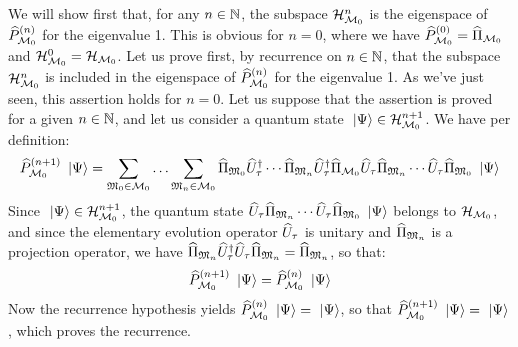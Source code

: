  We will show first that, for any $n \in \mathbb{N}$, the subspace $\mathcal H_{\mathcal M_0}^n$ is the eigenspace of $\widehat{P}_{\mathcal M_0}^{(n)}$ for the eigenvalue 1. This is obvious for $n = 0$, where we have $\widehat{P}_{\mathcal M_0}^{(0)} = \widehat{\Pi}_{\mathcal M_0}$ and $\mathcal H_{\mathcal M_0}^0 = \mathcal H_{\mathcal M_0}$. Let us prove first, by recurrence on $n \in \mathbb{N}$, that the subspace $\mathcal H_{\mathcal M_0}^n$ is included in the eigenspace of $\widehat{P}_{\mathcal M_0}^{(n)}$ for the eigenvalue 1. As we've just seen, this assertion holds for $n = 0$. Let us suppose that the assertion is proved for a given $n \in \mathbb{N}$, and let us consider a quantum state $\ \left|{\Psi}\right\rangle \in \mathcal H_{\mathcal M_0}^{n+1}$. We have per definition:
\begin{equation*}
\widehat{P}_{\mathcal M_0}^{(n+1)} \ \left|{\Psi}\right\rangle = \sum_{\mathfrak{M}_0 \in \mathcal M_0} \dotsc \sum_{\mathfrak{M}_n \in \mathcal M_0} \widehat{\Pi}_{\mathfrak{M}_0} \widehat{U}^{\dagger}_\tau \dotsm \widehat{\Pi}_{\mathfrak{M}_n} \widehat{U}^{\dagger}_\tau \widehat{\Pi}_{\mathcal M_0} \widehat{U}_\tau \widehat{\Pi}_{\mathfrak{M}_n} \dotsm \widehat{U}_\tau \widehat{\Pi}_{\mathfrak{M}_0} \ \left|{\Psi}\right\rangle
\end{equation*}
Since $\ \left|{\Psi}\right\rangle \in \mathcal H_{\mathcal M_0}^{n+1}$, the quantum state $\widehat{U}_\tau \widehat{\Pi}_{\mathfrak{M}_n} \dotsm \widehat{U}_\tau \widehat{\Pi}_{\mathfrak{M}_0} \ \left|{\Psi}\right\rangle$ belongs to $\mathcal H_{\mathcal M_0}$, and since the elementary evolution operator $\widehat{U}_\tau$ is unitary and $\widehat{\Pi}_{\mathfrak{M}_n}$ is a projection operator, we have $\widehat{\Pi}_{\mathfrak{M}_n} \widehat{U}^{\dagger}_\tau \widehat{U}_\tau \widehat{\Pi}_{\mathfrak{M}_n} = \widehat{\Pi}_{\mathfrak{M}_n}$, so that:
\begin{equation*}
\widehat{P}_{\mathcal M_0}^{(n+1)} \ \left|{\Psi}\right\rangle = \widehat{P}_{\mathcal M_0}^{(n)} \ \left|{\Psi}\right\rangle
\end{equation*}
Now the recurrence hypothesis yields $\widehat{P}_{\mathcal M_0}^{(n)} \ \left|{\Psi}\right\rangle = \ \left|{\Psi}\right\rangle$, so that $\widehat{P}_{\mathcal M_0}^{(n+1)} \ \left|{\Psi}\right\rangle = \ \left|{\Psi}\right\rangle$, which proves the recurrence.

